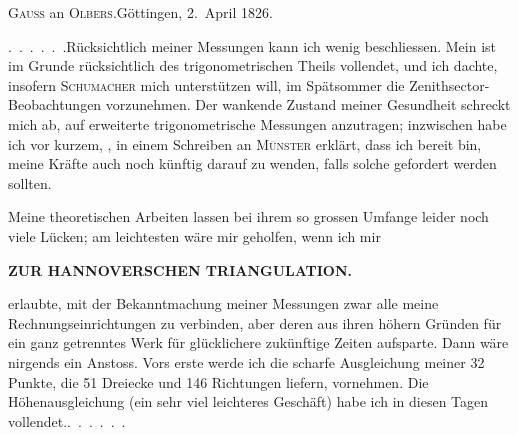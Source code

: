 \begin{center}
\textsc{Gauss} an \textsc{Olbers}.\quad Göttingen, 2.~April 1826.
\end{center}

\par\noindent\hspace*{\parindent}\mbox{.\ .\ .\ .\ .\ .}\quad Rücksichtlich meiner Messungen kann ich  wenig beschliessen.
Mein  ist im Grunde rücksichtlich des trigonometrischen Theils vollendet, und ich dachte, insofern \textsc{Schumacher} mich  unterstützen will, im Spätsommer die Zenithsector-Beobachtungen vorzunehmen.
Der wankende Zustand meiner Gesundheit schreckt mich ab, auf erweiterte trigonometrische Messungen anzutragen; inzwischen habe ich vor kurzem, , in einem Schreiben an \textsc{Münster} erklärt, dass ich bereit bin, meine Kräfte auch noch künftig darauf zu wenden, falls solche gefordert werden sollten.

\par\noindent\hspace*{\parindent}Meine theoretischen Arbeiten lassen bei ihrem so  grossen Umfange leider noch viele Lücken; am leichtesten wäre mir geholfen, wenn ich mir
\par\clearpage
\noindent\null\hfill{\small\textbf{ZUR HANNOVERSCHEN TRIANGULATION.}}\hfill{}\par\medskip
\noindent erlaubte, mit der Bekanntmachung meiner Messungen zwar alle meine Rechnungseinrichtungen zu verbinden, aber deren  aus ihren höhern Gründen für ein ganz getrenntes Werk für glücklichere zukünftige Zeiten aufsparte.
Dann wäre nirgends ein Anstoss.
Vors erste werde ich die scharfe Ausgleichung meiner 32 Punkte, die 51 Dreiecke und 146 Richtungen liefern, vornehmen.
Die Höhenausgleichung (ein sehr viel leichteres Geschäft) habe ich in diesen Tagen vollendet.\quad\mbox{.\ .\ .\ .\ .\ .}

